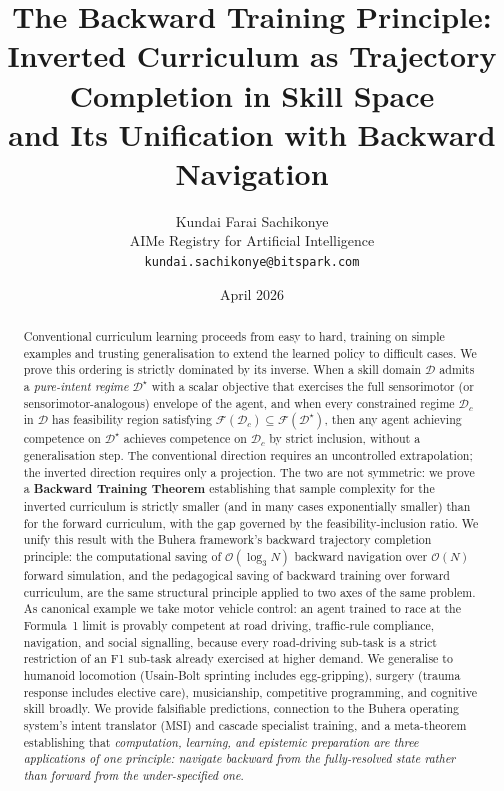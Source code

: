 \documentclass[11pt,twocolumn,a4paper]{article}
\title{\textbf{The Backward Training Principle:\\[4pt]
Inverted Curriculum as Trajectory Completion in Skill Space\\[4pt]
and Its Unification with Backward Navigation}}
\author{
Kundai Farai Sachikonye\\
AIMe Registry for Artificial Intelligence\\
\texttt{kundai.sachikonye@bitspark.com}
}
\date{April 2026}
\newcommand{\cF}{\mathcal{F}}
\newcommand{\cD}{\mathcal{D}}
\begin{document}
\maketitle

\begin{abstract}
Conventional curriculum learning proceeds from easy to hard, training on simple examples and trusting generalisation to extend the learned policy to difficult cases. We prove this ordering is strictly dominated by its inverse. When a skill domain $\cD$ admits a \emph{pure-intent regime} $\cD^\star$ with a scalar objective that exercises the full sensorimotor (or sensorimotor-analogous) envelope of the agent, and when every constrained regime $\cD_c$ in $\cD$ has feasibility region satisfying $\cF(\cD_c) \subseteq \cF(\cD^\star)$, then any agent achieving competence on $\cD^\star$ achieves competence on $\cD_c$ by strict inclusion, without a generalisation step. The conventional direction requires an uncontrolled extrapolation; the inverted direction requires only a projection. The two are not symmetric: we prove a \textbf{Backward Training Theorem} establishing that sample complexity for the inverted curriculum is strictly smaller (and in many cases exponentially smaller) than for the forward curriculum, with the gap governed by the feasibility-inclusion ratio. We unify this result with the Buhera framework's backward trajectory completion principle: the computational saving of $\mathcal{O}(\log_3 N)$ backward navigation over $\mathcal{O}(N)$ forward simulation, and the pedagogical saving of backward training over forward curriculum, are the same structural principle applied to two axes of the same problem. As canonical example we take motor vehicle control: an agent trained to race at the Formula~1 limit is provably competent at road driving, traffic-rule compliance, navigation, and social signalling, because every road-driving sub-task is a strict restriction of an F1 sub-task already exercised at higher demand. We generalise to humanoid locomotion (Usain-Bolt sprinting includes egg-gripping), surgery (trauma response includes elective care), musicianship, competitive programming, and cognitive skill broadly. We provide falsifiable predictions, connection to the Buhera operating system's intent translator (MSI) and cascade specialist training, and a meta-theorem establishing that \emph{computation, learning, and epistemic preparation are three applications of one principle: navigate backward from the fully-resolved state rather than forward from the under-specified one}.
\end{abstract}
\end{document}
